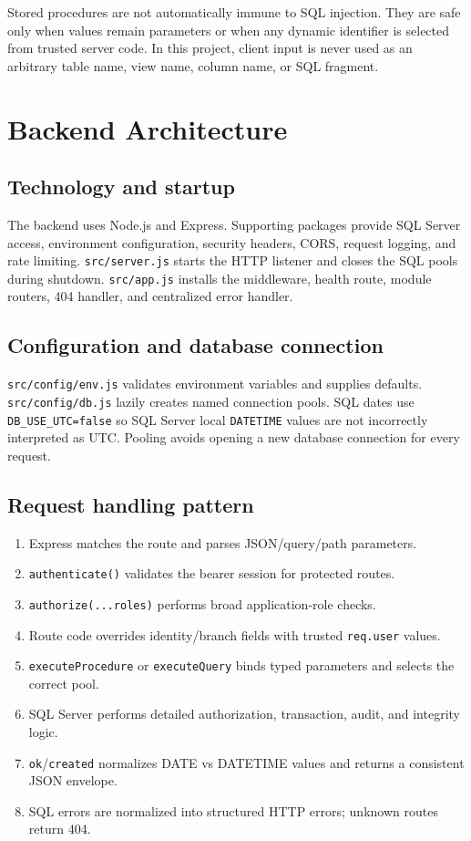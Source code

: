 \documentclass[11pt,a4paper,oneside]{report}
\newcommand{\codepath}[1]{\nolinkurl{#1}}
\begin{document}
\begin{warningbox}
Stored procedures are not automatically immune to SQL injection. They are safe only when values remain parameters or when any dynamic identifier is selected from trusted server code. In this project, client input is never used as an arbitrary table name, view name, column name, or SQL fragment.
\end{warningbox}

\chapter{Backend Architecture}
\section{Technology and startup}
The backend uses Node.js and Express. Supporting packages provide SQL Server access, environment configuration, security headers, CORS, request logging, and rate limiting. \codepath{src/server.js} starts the HTTP listener and closes the SQL pools during shutdown. \codepath{src/app.js} installs the middleware, health route, module routers, 404 handler, and centralized error handler.

\section{Configuration and database connection}
\texttt{src/config/env.js} validates environment variables and supplies defaults. \texttt{src/config/db.js} lazily creates named connection pools. SQL dates use \texttt{DB\_USE\_UTC=false} so SQL Server local \texttt{DATETIME} values are not incorrectly interpreted as UTC. Pooling avoids opening a new database connection for every request.

\section{Request handling pattern}
\begin{enumerate}
\item Express matches the route and parses JSON/query/path parameters.
\item \texttt{authenticate()} validates the bearer session for protected routes.
\item \texttt{authorize(...roles)} performs broad application-role checks.
\item Route code overrides identity/branch fields with trusted \texttt{req.user} values.
\item \texttt{executeProcedure} or \texttt{executeQuery} binds typed parameters and selects the correct pool.
\item SQL Server performs detailed authorization, transaction, audit, and integrity logic.
\item \texttt{ok}/\texttt{created} normalizes DATE vs DATETIME values and returns a consistent JSON envelope.
\item SQL errors are normalized into structured HTTP errors; unknown routes return 404.
\end{enumerate}
\end{document}
